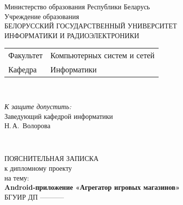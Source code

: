\begin{titlepage}
  \begin{center}
    Министерство образования Республики Беларусь\\[1em]
    Учреждение образования\\
    БЕЛОРУССКИЙ ГОСУДАРСТВЕННЫЙ УНИВЕРСИТЕТ \\
    ИНФОРМАТИКИ И РАДИОЭЛЕКТРОНИКИ\\[1em]

    \begin{minipage}{\textwidth}
      \begin{flushleft}
        \begin{tabular}{ l l }
          Факультет & Компьютерных систем и сетей\\
          Кафедра   & Информатики
        \end{tabular}
      \end{flushleft}
    \end{minipage}\\[1em]

    \begin{flushright}
      \begin{minipage}{0.4\textwidth}
        \textit{К защите допустить:}\\[0.8em]
        Заведующий кафедрой информатики\\[0.45em]
        \underline{\hspace*{2.8cm}} Н.\,А.~Волорова
      \end{minipage}\\[2.2em]
    \end{flushright}

    {ПОЯСНИТЕЛЬНАЯ ЗАПИСКА}\\
    {к дипломному проекту}\\
    {на тему:}\\[1em]
    \textbf{\large Android-приложение «Агрегатор игровых магазинов»}\\[1em]


     {БГУИР ДП -----------}\\[2em]
    

\end{center}
\end{titlepage}
